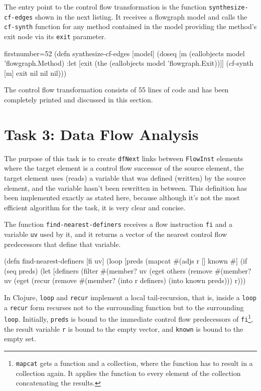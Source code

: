 \documentclass[11pt]{article}
\begin{document}
The entry point to the control flow transformation is the function
\verb|synthesize-cf-edges| shown in the next listing.  It receives a flowgraph
model and calls the \verb|cf-synth| function for any method contained in the
model providing the method's exit node via its \verb|exit| parameter.

\begin{clojurecode*}{firstnumber=52}
(defn synthesize-cf-edges [model]
  (doseq [m (eallobjects model 'flowgraph.Method)
          :let [exit (the (eallobjects model 'flowgraph.Exit))]]
    (cf-synth [m] exit nil nil nil)))
\end{clojurecode*}

The control flow transformation consists of 55 lines of code and has been
completely printed and discussed in this section.


\section{Task 3: Data Flow Analysis}
\label{sec:task-3}

The purpose of this task is to create \verb|dfNext| links between
\verb|FlowInst| elements where the target element is a control flow successor
of the source element, the target element uses (reads) a variable that was
defined (written) by the source element, and the variable hasn't been rewritten
in between.  This definition has been implemented exactly as stated here,
because although it's not the most efficient algorithm for the task, it is very
clear and concise.

The function \verb|find-nearest-definers| receives a flow instruction \verb|fi|
and a variable \verb|uv| used by it, and it returns a vector of the nearest
control flow predecessors that define that variable.

\begin{clojurecode}
(defn find-nearest-definers [fi uv]
  (loop [preds (mapcat #(adjs %
         r []
         known #{}]
    (if (seq preds)
      (let [definers (filter #(member? uv (eget %
            others   (remove #(member? uv (eget %
        (recur (remove #(member? %
               (into r definers)
               (into known preds)))
      r)))
\end{clojurecode}

In Clojure, \verb|loop| and \verb|recur| implement a local tail-recursion, that
is, inside a \verb|loop| a \verb|recur| form recurses not to the surrounding
function but to the surrounding \verb|loop|.  Initially, \verb|preds| is bound
to the immediate control flow predecessors of
\verb|fi|\footnote{\texttt{mapcat} gets a function and a collection, where the
  function has to result in a collection again.  It applies the function to
  every element of the collection concatenating the results.}, the result
variable \verb|r| is bound to the empty vector, and \verb|known| is bound to
the empty set.
\end{document}
